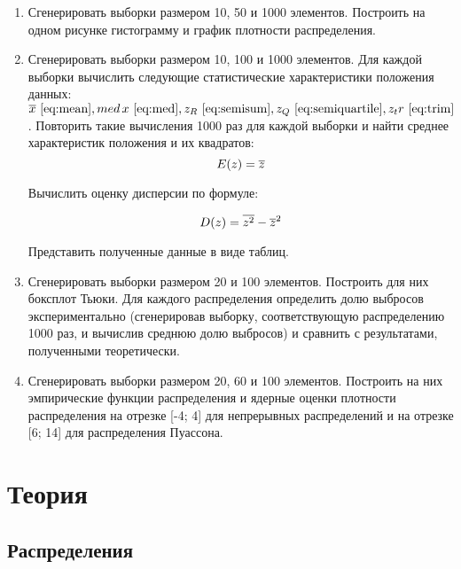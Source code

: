 \documentclass[12pt,a4paper]{scrartcl}
\begin{document}
\begin{enumerate}
 \item Сгенерировать выборки размером 10, 50 и 1000 элементов.
Построить на одном рисунке гистограмму и график плотности распределения.

\item Сгенерировать выборки размером 10, 100 и 1000 элементов.
Для каждой выборки вычислить следующие статистические характеристики положения данных:
$\overline x ~\eqref{eq:mean}, med\, x~\eqref{eq:med}, z_R ~\eqref{eq:semisum}, z_Q ~\eqref{eq:semiquartile}, z_tr~\eqref{eq:trim}$. Повторить такие
вычисления 1000 раз для каждой выборки и найти среднее характеристик положения и их квадратов:\begin{equation}\label{eq:expectation}
\centering
 E(z) = \overline z
\end{equation}

Вычислить оценку дисперсии по формуле:

\begin{equation}\label{eq:dispertion}
\centering
 D(z) = \overline {z^2} - \overline z^2
\end{equation}

Представить полученные данные в виде таблиц.

\item

Сгенерировать выборки размером 20 и 100 элементов.
Построить для них боксплот Тьюки.
Для каждого распределения определить долю выбросов экспериментально (сгенерировав выборку, соответствующую распределению 1000
раз, и вычислив среднюю долю выбросов) и сравнить с результатами,
полученными теоретически.

\item

Сгенерировать выборки размером 20, 60 и 100 элементов.
Построить на них эмпирические функции распределения и ядерные
оценки плотности распределения на отрезке [-4; 4] для непрерывных
распределений и на отрезке [6; 14] для распределения Пуассона.

\end{enumerate}
 
\section{Теория}

\subsection{Распределения}
\end{document}
